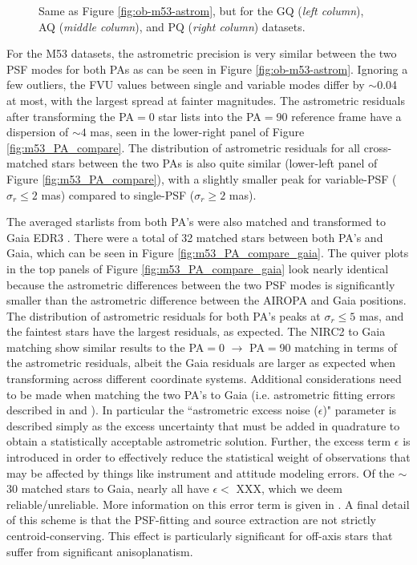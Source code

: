 \documentclass[]{spie}  %
\begin{document}
\begin{figure}[!h]
 \caption{\footnotesize Same as Figure \ref{fig:ob-m53-astrom}, but for the GQ (\textit{left column}), AQ (\textit{middle column}), and PQ (\textit{right column}) datasets.} \label{fig:gc-astrom}
\end{figure}

For the M53 datasets, the astrometric precision is very similar between the two PSF modes for both PAs as can be seen in Figure \ref{fig:ob-m53-astrom}. Ignoring a few outliers, the FVU values between single and variable modes differ by ${\sim}$0.04 at most, with the largest spread at fainter magnitudes. The astrometric residuals after transforming the PA$=$0 star lists into the PA$=$90 reference frame have a dispersion of ${\sim}4$ mas, seen in the lower-right panel of Figure \ref{fig:m53_PA_compare}. The distribution of astrometric residuals for all cross-matched stars between the two PAs is also quite similar (lower-left panel of Figure \ref{fig:m53_PA_compare}), with a slightly smaller peak for variable-PSF ($\sigma_{r}\leq2$ mas) compared to single-PSF ($\sigma_{r}\geq2$ mas). 

The averaged starlists from both PA's were also matched and transformed to Gaia EDR3 \citep{brown:2021a}. There were a total of 32 matched stars between both PA's and Gaia, which can be seen in Figure \ref{fig:m53_PA_compare_gaia}. The quiver plots in the top panels of Figure \ref{fig:m53_PA_compare_gaia} look nearly identical because the astrometric differences between the two PSF modes is significantly smaller than the astrometric difference between the AIROPA and Gaia positions. The distribution of astrometric residuals for both PA's peaks at $\sigma_{r}\leq5$ mas, and the faintest stars have the largest residuals, as expected. The NIRC2 to Gaia matching show similar results to the PA$=$0 $\rightarrow$ PA$=$90 matching in terms of the astrometric residuals, albeit the Gaia residuals are larger as expected when transforming across different coordinate systems. Additional considerations need to be made when matching the two PA's to Gaia (i.e. astrometric fitting errors described in \cite{brown:2018a} and \cite{brown:2021a}). In particular the ``astrometric excess noise ($\epsilon$)" parameter is described simply as the excess uncertainty that must be added in quadrature to obtain a statistically acceptable astrometric solution. Further, the excess term $\epsilon$ is introduced in order to effectively reduce the statistical weight of observations that may be affected by things like instrument and attitude modeling errors. Of the ${\sim}$30 matched stars to Gaia, nearly all have $\epsilon < $ XXX, which we deem reliable/unreliable. More information on this error term is given in \cite{lindegren:2012a}. A final detail of this scheme is that the PSF-fitting and source extraction are not strictly centroid-conserving. This effect is particularly significant for off-axis stars that suffer from significant anisoplanatism.
\end{document}
